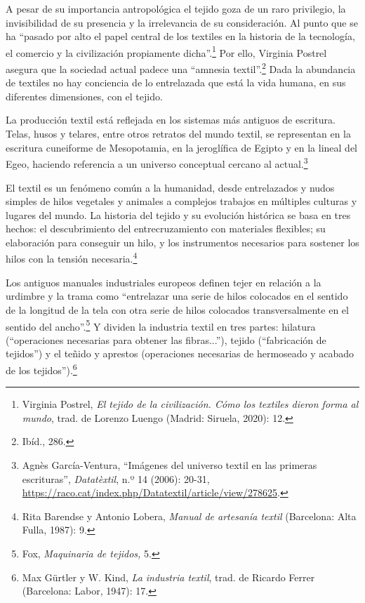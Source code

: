 \documentclass{tufte-handout}
\begin{document}
A pesar de su importancia antropológica el tejido goza de un raro
privilegio, la invisibilidad de su presencia y la irrelevancia de su
consideración. Al punto que se ha ``pasado por alto el papel central de
los textiles en la historia de la tecnología, el comercio y la
civilización propiamente dicha''.\footnote{Virginia Postrel, \emph{El
  tejido de la civilización. Cómo los textiles dieron forma al mundo},
  trad. de Lorenzo Luengo (Madrid: Siruela, 2020): 12.} Por ello,
Virginia Postrel asegura que la sociedad actual padece una ``amnesia
textil''.\footnote{Ibíd., 286.} Dada la abundancia de textiles no hay
conciencia de lo entrelazada que está la vida humana, en sus diferentes
dimensiones, con el tejido.

\enlargethispage{-\baselineskip}

La producción textil está reflejada en los sistemas más antiguos de
escritura. Telas, husos y telares, entre otros retratos del mundo
textil, se representan en la escritura cuneiforme de Mesopotamia, en la
jeroglífica de Egipto y en la lineal del Egeo, haciendo referencia a un
universo conceptual cercano al actual.\footnote{Agnès García-Ventura,
  ``Imágenes del universo textil en las primeras escrituras'',
  \emph{Datatèxtil}, n.º 14 (2006): 20-31,
  \url{https://raco.cat/index.php/Datatextil/article/view/278625}.}

El textil es un fenómeno común a la humanidad, desde entrelazados y
nudos simples de hilos vegetales y animales a complejos trabajos en
múltiples culturas y lugares del mundo. La historia del tejido y su
evolución histórica se basa en tres hechos: el descubrimiento del
entrecruzamiento con materiales flexibles; su elaboración para conseguir
un hilo, y los instrumentos necesarios para sostener los hilos con la
tensión necesaria.\footnote{Rita Barendse y Antonio Lobera, \emph{Manual
  de artesanía textil} (Barcelona: Alta Fulla, 1987): 9.}

Los antiguos manuales industriales europeos definen tejer en relación a
la urdimbre y la trama como ``entrelazar una serie de hilos colocados en
el sentido de la longitud de la tela con otra serie de hilos colocados
transversalmente en el sentido del ancho''.\footnote{Fox,
  \emph{Maquinaria de tejidos,} 5.} Y dividen la industria textil en
tres partes: hilatura (``operaciones necesarias para obtener las
fibras...''), tejido (``fabricación de tejidos'') y el teñido y aprestos
(operaciones necesarias de hermoseado y acabado de los
tejidos'').\footnote{Max Gürtler y W. Kind, \emph{La industria textil},
  trad. de Ricardo Ferrer (Barcelona: Labor, 1947): 17.}
\end{document}

